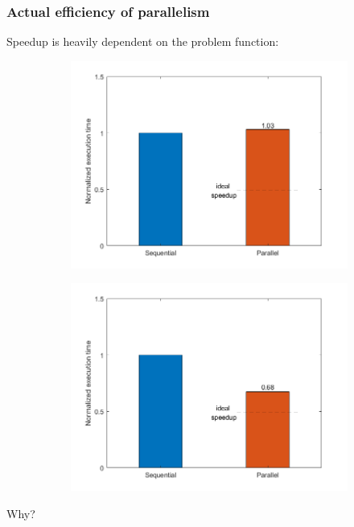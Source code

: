 \documentclass{beamer}
\begin{document}
\begin{frame} %
	\frametitle{Actual efficiency of parallelism}
	Speedup is heavily dependent on the problem function:
	\begin{figure}
		\begin{subfigure}{.5\textwidth}
			\includegraphics[width=\linewidth]{etc/test_5_speedup.jpeg}
		\end{subfigure}%
		\begin{subfigure}{.5\textwidth}
			\includegraphics[width=\linewidth]{etc/test_6_speedup.jpeg}
		\end{subfigure}%
	\end{figure}
	\begin{center}
		Why?
	\end{center}
	
\end{frame}
\end{document}

